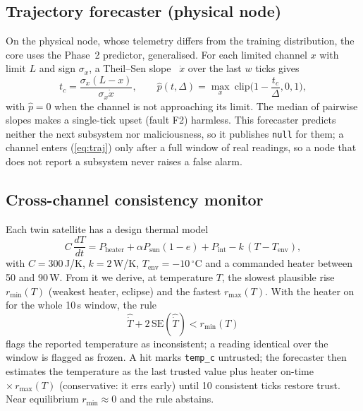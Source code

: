 \documentclass[conference]{IEEEtran}
\newcommand{\degC}{$^{\circ}$C}
\begin{document}
\subsection{Trajectory forecaster (physical node)}
On the physical node, whose telemetry differs from the training distribution, the core uses the Phase~2
predictor, generalised. For each limited channel $x$ with limit $L$ and sign $\sigma_x$, a Theil--Sen
slope~\cite{sen1968theilsen} $\dot x$ over the last $w$ ticks gives
\begin{equation}
t_c = \frac{\sigma_x (L-x)}{\sigma_x\dot x},\qquad
\hat p(t,\Delta)=\max_x\ \mathrm{clip}\Big(1-\frac{t_c}{\Delta},0,1\Big),
\label{eq:traj}
\end{equation}
with $\hat p=0$ when the channel is not approaching its limit. The median of pairwise slopes makes a
single-tick upset (fault F2) harmless. This forecaster predicts neither the next subsystem nor
maliciousness, so it publishes \texttt{null} for them; a channel enters (\ref{eq:traj}) only after a
full window of real readings, so a node that does not report a subsystem never raises a false alarm.

\subsection{Cross-channel consistency monitor}
Each twin satellite has a design thermal model
\begin{equation}
C\,\frac{dT}{dt} = P_{\mathrm{heater}} + \alpha P_{\mathrm{sun}}(1-e) + P_{\mathrm{int}}
- k\,(T-T_{\mathrm{env}}),
\label{eq:thermal}
\end{equation}
with $C=300$\,J/K, $k=2$\,W/K, $T_{\mathrm{env}}=-10$\,\degC{} and a commanded heater between 50 and
90\,W. From it we derive, at temperature $T$, the slowest plausible rise $r_{\min}(T)$ (weakest
heater, eclipse) and the fastest $r_{\max}(T)$. With the heater on for the whole 10\,s window, the
rule
\begin{equation}
\hat{\dot T} + 2\,\mathrm{SE}(\hat{\dot T}) < r_{\min}(T)
\label{eq:monitor}
\end{equation}
flags the reported temperature as inconsistent; a reading identical over the window is flagged as
frozen. A hit marks \texttt{temp\_c} untrusted; the forecaster then estimates the temperature as the
last trusted value plus heater on-time $\times\, r_{\max}(T)$ (conservative: it errs early) until 10
consistent ticks restore trust. Near equilibrium $r_{\min}\approx 0$ and the rule abstains.
\end{document}

